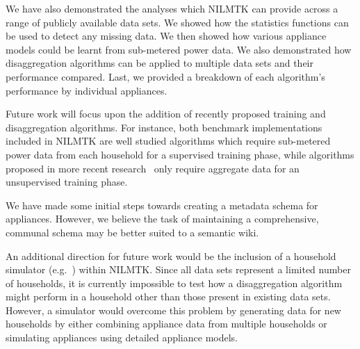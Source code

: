 \documentclass{sig-alternate}
\begin{document}
We have also demonstrated the analyses which NILMTK can provide across a range of publicly available data sets. We showed how the statistics functions can be used to detect any missing data. We then showed how various appliance models could be learnt from sub-metered power data. We also demonstrated how disaggregation algorithms can be applied to multiple data sets and their performance compared. Last, we provided a breakdown of each algorithm’s performance by individual appliances.

Future work will focus upon the addition of recently proposed training and disaggregation algorithms. For instance, both benchmark implementations included in NILMTK are well studied algorithms which require sub-metered power data from each household for a supervised training phase, while algorithms proposed in more recent research~\cite{kim_2011,parson_2012} only require aggregate data for an unsupervised training phase.  

We have made some initial steps towards creating a metadata schema for appliances.  However, we believe the task of maintaining a comprehensive, communal schema may be better suited to a semantic wiki.

An additional direction for future work would be the inclusion of a household simulator (e.g.\ \cite{liang_2010}) within NILMTK. Since all data sets represent a limited number of households, it is currently impossible to test how a disaggregation algorithm might perform in a household other than those present in existing data sets. However, a simulator would overcome this problem by generating data for new households by either combining appliance data from multiple households or simulating appliances using detailed appliance models.


\end{document}
